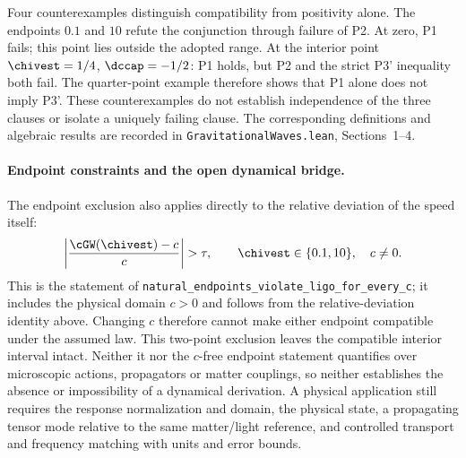 Four counterexamples distinguish compatibility from positivity
alone. The endpoints $0.1$ and $10$ refute the conjunction through
failure of P2. At zero, P1 fails; this point lies outside the
adopted range. At the interior point $\chivest=1/4$,
$\dccap=-1/2$: P1 holds, but P2 and the strict P3' inequality
both fail. The quarter-point example therefore shows that P1
alone does not imply P3'. These counterexamples do not establish
independence of the three clauses or isolate a uniquely failing
clause. The corresponding definitions and algebraic results are
recorded in \texttt{GravitationalWaves.lean}, Sections~1--4.

\paragraph{Endpoint constraints and the open dynamical bridge.}
The endpoint exclusion also applies directly to the relative
deviation of the speed itself:
\[
  \left|\frac{\cGW(\chivest)-c}{c}\right|>\tau,
  \qquad
  \chivest\in\{0.1,10\},\quad c\ne0.
\]
This is the statement of
\texttt{natural\_endpoints\_violate\_ligo\_for\_every\_c};
it includes the physical domain $c>0$ and follows from the
relative-deviation identity above. Changing $c$ therefore
cannot make either endpoint compatible under the assumed law.
This two-point exclusion leaves the compatible interior interval
intact. Neither it nor the $c$-free endpoint statement quantifies
over microscopic actions, propagators or matter couplings, so
neither establishes the absence or impossibility of a dynamical
derivation. A physical application still requires the response
normalization and domain, the physical state, a propagating
tensor mode relative to the same matter/light reference, and
controlled transport and frequency matching with units and
error bounds.

